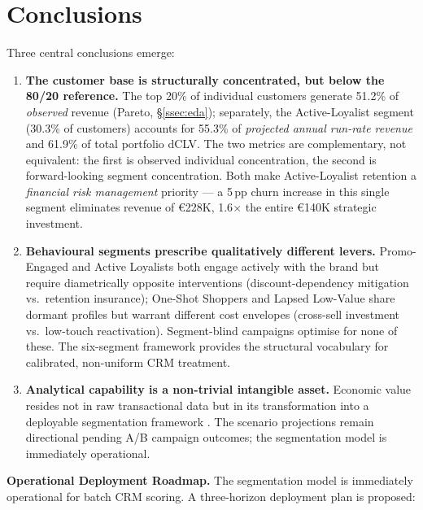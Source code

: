 \documentclass[10pt,a4paper]{article}
\newcommand{\eur}{€}
\begin{document}
\section{Conclusions}
\label{sec:conclusions}

Three central conclusions emerge:

\begin{enumerate}
  \item \textbf{The customer base is structurally concentrated, but below the
    80/20 reference.} The top 20\% of individual customers generate 51.2\% of
    \emph{observed} revenue (Pareto, \S\ref{ssec:eda}); separately, the
    Active-Loyalist segment (30.3\% of customers) accounts for 55.3\% of
    \emph{projected annual run-rate revenue} and 61.9\% of total portfolio dCLV.
    The two metrics are complementary, not equivalent: the first is observed
    individual concentration, the second is forward-looking segment concentration.
    Both make Active-Loyalist retention a \textit{financial risk management}
    priority --- a 5\,pp churn increase in this single segment eliminates revenue
    of \eur228K, 1.6$\times$ the entire \eur140K strategic investment.
  \item \textbf{Behavioural segments prescribe qualitatively different levers.}
    Promo-Engaged and Active Loyalists both engage actively with the brand but require
    diametrically opposite interventions (discount-dependency mitigation vs.\
    retention insurance); One-Shot Shoppers and Lapsed Low-Value share dormant profiles
    but warrant different cost envelopes (cross-sell investment vs.\ low-touch
    reactivation). Segment-blind campaigns optimise for none of these. The six-segment
    framework provides the structural vocabulary for calibrated, non-uniform CRM
    treatment.
  \item \textbf{Analytical capability is a non-trivial intangible asset.}
    Economic value resides not in raw transactional data but in its transformation into
    a deployable segmentation framework \cite{corrado2009intangible,haskel2018capitalism}.
    The scenario projections remain directional pending A/B campaign outcomes;
    the segmentation model is immediately operational.
\end{enumerate}

\textbf{Operational Deployment Roadmap.}
The segmentation model is immediately operational for batch CRM scoring. A three-horizon
deployment plan is proposed:
\end{document}
